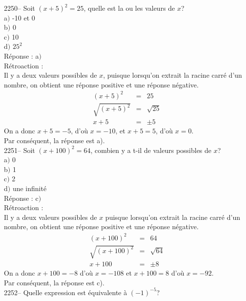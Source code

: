 \documentclass[letterpaper, 12pt]{article}
\begin{document}
2250-- Soit $(x+5)^{2}=25$, quelle est la ou les valeurs de $x$?\\

a$)$ -10 et 0\\
b$)$ 0\\
c$)$ 10\\
d$)$ $25^{2}$\\

R\'eponse : a$)$\\

R\'etroaction :\\
Il y a deux valeurs possibles de $x$, puisque lorsqu'on extrait la racine carr\'e d'un nombre, on obtient une r\'eponse positive et une r\'eponse n\'egative.\\
\begin{eqnarray*}
(x+5)^{2}&=&25\\
 \sqrt{(x+5)^{2}}&=&\sqrt{25}\\
 x+5&=&\pm5
\end{eqnarray*}
On a donc $x+5=-5$, d'o\`u $x=-10$, et $x+5=5$, d'o\`u $x=0$.\\
Par cons\'equent, la r\'eponse est a).\\

2251-- Soit $(x+100)^{2}=64$, combien y a t-il de valeurs possibles de $x$?\\

a$)$ 0\\
b$)$ 1\\
c$)$ 2\\
d$)$ une infinit\'e\\

R\'eponse : c$)$\\

R\'etroaction :\\
Il y a deux valeurs possibles de $x$ puisque lorsqu'on extrait la racine carr\'e d'un nombre, on obtient une r\'eponse positive et une r\'eponse n\'egative.\\
\begin{eqnarray*}
(x+100)^{2}&=&64\\
 \sqrt{(x+100)^{2}}&=&\sqrt{64}\\
 x+100&=&\pm8
\end{eqnarray*}
On a donc $x+100=-8$ d'o\`u $x=-108$ et $x+100=8$ d'o\`u $x=-92$.\\
Par cons\'equent, la r\'eponse est c).\\

2252-- Quelle expression est \'equivalente \`a $(-1)^{-5}$?\\
\end{document}
